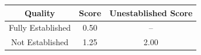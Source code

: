 \begin{tabular}{ccc}
\toprule
\textbf{Quality} & \textbf{Score} & \textbf{Unestablished Score} \\
\midrule
Fully Established & 0.50 & -- \\
Not Established & 1.25 & 2.00 \\
\bottomrule
\end{tabular}
